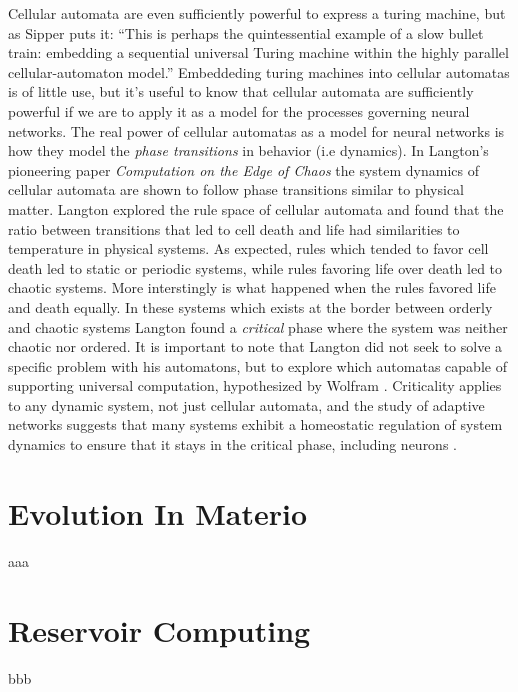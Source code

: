 Cellular automata are even sufficiently powerful to express a turing machine,
but as Sipper puts it: ``This is perhaps the quintessential example of a slow
bullet train: embedding a sequential universal Turing machine within the
highly parallel cellular-automaton model.''
Embeddeding turing machines into cellular automatas is of little use, but it's
useful to know that cellular automata are sufficiently powerful if we are to
apply it as a model for the processes governing neural networks.
The real power of cellular automatas as a model for neural networks is how they
model the \emph{phase transitions} in behavior (i.e dynamics).
In Langton's pioneering paper \emph{Computation on the Edge of Chaos} \cite{langton_computation_1990} 
the system dynamics of cellular automata are shown to follow phase transitions
similar to physical matter.
Langton explored the rule space of cellular automata and found that the ratio
between transitions that led to cell death and life had similarities to
temperature in physical systems.
As expected, rules which tended to favor cell death led to static or periodic
systems, while rules favoring life over death led to chaotic systems.
More interstingly is what happened when the rules favored life and death
equally.
In these systems which exists at the border between orderly and chaotic systems
Langton found a \emph{critical} phase where the system was neither chaotic nor
ordered.
It is important to note that Langton did not seek to solve a specific problem
with his automatons, but to explore which automatas capable of supporting
universal computation, hypothesized by Wolfram \cite{wolfram_universality_1984}.
Criticality applies to any dynamic system, not just cellular automata, and the
study of adaptive networks \cite{sayama_modeling_2013} suggests that many
systems exhibit a homeostatic regulation of system dynamics to ensure that it
stays in the critical phase, including neurons
\cite{bornholdt_topological_2000}.
\section{Evolution In Materio}
aaa
\section{Reservoir Computing}
bbb
